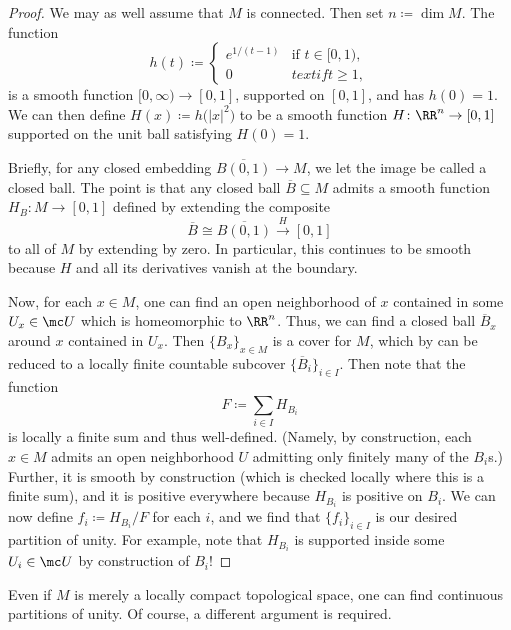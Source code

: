 \documentclass[../notes.tex]{subfiles}
\begin{document}
\begin{proof}
	We may as well assume that $M$ is connected. Then set $n\coloneqq\dim M$. The function
	\[h(t)\coloneqq\begin{cases}
		e^{1/(t-1)} & \text{if }t\in[0,1), \\
		0 & text{if }t\ge1,
	\end{cases}\]
	is a smooth function $[0,\infty)\to[0,1]$, supported on $[0,1]$, and has $h(0)=1$. We can then define $H(x)\coloneqq h\big(\left|x\right|^2\big)$ to be a smooth function $H\colon\RR^n\to[0,1]$ supported on the unit ball satisfying $H(0)=1$.

	Briefly, for any closed embedding $\overline{B(0,1)}\to M$, we let the image be called a closed ball. The point is that any closed ball $\overline B\subseteq M$ admits a smooth function $H_B\colon M\to[0,1]$ defined by extending the composite
	\[\overline B\cong\overline{B(0,1)}\stackrel H\to[0,1]\]
	to all of $M$ by extending by zero. In particular, this continues to be smooth because $H$ and all its derivatives vanish at the boundary.

	Now, for each $x\in M$, one can find an open neighborhood of $x$ contained in some $U_x\in\mc U$ which is homeomorphic to $\RR^n$. Thus, we can find a closed ball $\overline B_x$ around $x$ contained in $U_x$. Then $\{B_x\}_{x\in M}$ is a cover for $M$, which by  can be reduced to a locally finite countable subcover $\{\overline B_i\}_{i\in I}$. Then note that the function
	\[F\coloneqq\sum_{i\in I}H_{B_i}\]
	is locally a finite sum and thus well-defined. (Namely, by construction, each $x\in M$ admits an open neighborhood $U$ admitting only finitely many of the $B_i$s.) Further, it is smooth by construction (which is checked locally where this is a finite sum), and it is positive everywhere because $H_{B_i}$ is positive on $B_i$. We can now define $f_i\coloneqq H_{B_i}/F$ for each $i$, and we find that $\{f_i\}_{i\in I}$ is our desired partition of unity. For example, note that $H_{B_i}$ is supported inside some $U_i\in\mc U$ by construction of $B_i$!
\end{proof}
\begin{remark}
	Even if $M$ is merely a locally compact topological space, one can find continuous partitions of unity. Of course, a different argument is required.
\end{remark}
\end{document}
